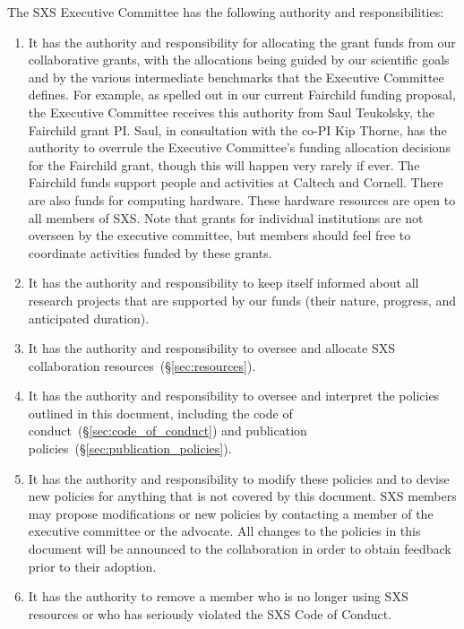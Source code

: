 \documentclass[12pt]{article}
\begin{document}
The SXS Executive Committee has the following authority and
  responsibilities:
\begin{enumerate}
\setlength\itemsep{-0.25em}
\item It has the authority and responsibility for allocating the grant
  funds from our collaborative grants, with the allocations being
  guided by our scientific goals and by the various intermediate
  benchmarks that the Executive Committee defines.  For example, as
  spelled out in our current Fairchild funding proposal, the Executive
  Committee receives this authority from Saul Teukolsky, the Fairchild
  grant PI.  Saul, in consultation with the co-PI Kip Thorne, has the
  authority to overrule the Executive Committee's funding allocation
  decisions for the Fairchild grant, though this will happen very
  rarely if ever.  The Fairchild funds support people and activities
  at Caltech and Cornell.  There are also funds for computing
  hardware. These hardware resources are open to all members of SXS.
  Note that grants for individual institutions are not overseen by the
  executive committee, but members should feel free to coordinate
  activities funded by these grants.
\item It has the authority and responsibility to keep itself informed
  about all research projects that are supported by our funds (their
  nature, progress, and anticipated duration).
\item It has the authority and responsibility to oversee and allocate
  SXS collaboration resources~(\S\ref{sec:resources}).
\item It has the authority and responsibility to oversee and interpret
  the policies outlined in this document, including the code of
  conduct~(\S\ref{sec:code_of_conduct}) and publication
  policies~(\S\ref{sec:publication_policies}).
\item It has the authority and responsibility to modify these policies
  and to devise new policies for anything that is not covered by this
  document.  SXS members may propose modifications or new policies by
  contacting a member of the executive committee or the advocate.  All
  changes to the policies in this document will be announced to the
  collaboration in order to obtain feedback prior to their adoption.
\item It has the authority to remove a member who is no longer using
  SXS resources or who has seriously violated the SXS Code of Conduct.
\end{enumerate}
\end{document}
